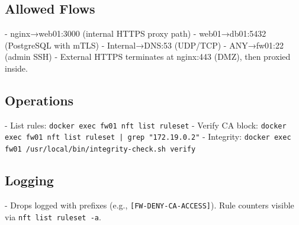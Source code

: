 \subsection{Allowed Flows}

- nginx→web01:3000 (internal HTTPS proxy path)
- web01→db01:5432 (PostgreSQL with mTLS)
- Internal→DNS:53 (UDP/TCP)
- ANY→fw01:22 (admin SSH)
- External HTTPS terminates at nginx:443 (DMZ), then proxied inside.

\subsection{Operations}

- List rules: \texttt{docker exec fw01 nft list ruleset}
- Verify CA block: \texttt{docker exec fw01 nft list ruleset | grep "172.19.0.2"}
- Integrity: \texttt{docker exec fw01 /usr/local/bin/integrity-check.sh verify}

\subsection{Logging}

- Drops logged with prefixes (e.g., \texttt{[FW-DENY-CA-ACCESS]}). Rule counters visible via \texttt{nft list ruleset -a}.
